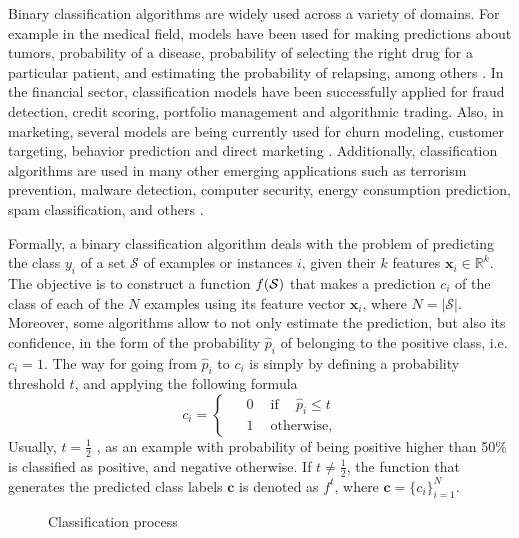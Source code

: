 Binary classification algorithms are widely used across a variety of domains. For example in the 
medical field, models have been used for making predictions about tumors, probability 
of a disease, probability of selecting the right drug for a particular patient, and estimating the 
probability of relapsing, among others \citep{Herland2014}. In the financial sector, classification 
models have been successfully applied for fraud detection, credit scoring, portfolio management and 
algorithmic trading. Also, in marketing, several models are being currently used for churn modeling, 
customer targeting, behavior prediction and direct marketing \citep{Baesens2014}. Additionally, 
classification algorithms are used in many other emerging applications such as terrorism 
prevention, malware detection, computer security, energy consumption prediction, spam 
classification, and others \citep{Kriegel2007}.

Formally, a binary classification algorithm deals with the problem	of predicting the class $y_i$ 
of a set $\mathcal{S}$ of examples or instances $i$, given their $k$ features \mbox{$\mathbf{x}_i 
\in \mathbb{R}^k$}. The objective is to construct a function $f(\cal{S})$ that makes a prediction 
$c_i$ of the class of each of the $N$ examples using its feature vector $\mathbf{x}_i$, where 
$N=\vert \mathcal{S} \vert$. Moreover, some algorithms allow to not only estimate the prediction, 
but also its confidence, in the form of the probability $\hat p_i$ of belonging to the positive 
class, i.e. $c_i = 1$. The way for going from $\hat p_i$ to $c_i$ is simply by defining a 
probability threshold $t$, and applying the following formula
\begin{equation}\label{eq_pred}
  c_i = 
  \begin{cases}
    \phantom{-}0 \phantom{-} \mbox{if} \phantom{-} \hat p_i \le t\\
    \phantom{-}1 \phantom{-}\mbox{otherwise,}
  \end{cases}
\end{equation}
Usually, $t=\frac{1}{2}$ \citep{Hastie2009}, as an example with probability of being positive 
higher than 50\% is classified as positive, and negative otherwise. If $t \ne \frac{1}{2}$, the 
function that generates the predicted class labels $\mathbf{c}$ is denoted as $f^t$, where 
$\mathbf{c}=\{c_i\}_{i=1}^{N}$.

\begin{figure}
	\centering
	
  \caption{Classification process}
  \label{fig:2:1}
\end{figure}


